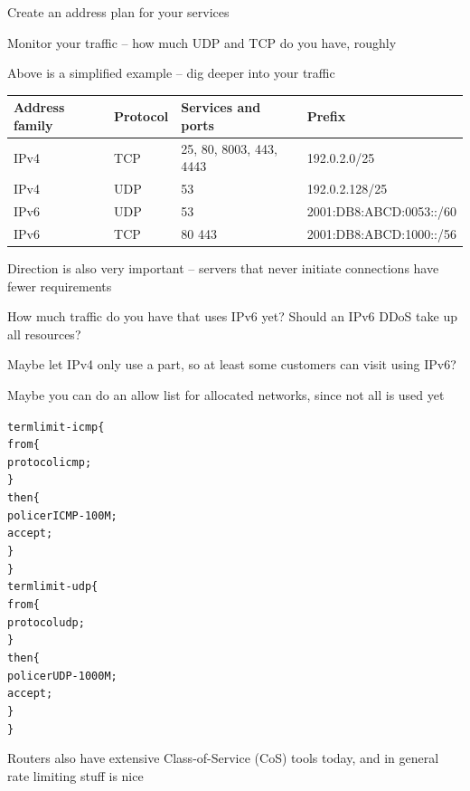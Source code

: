 \documentclass[Screen16to9,17pt]{foils}
\begin{document}
\begin{list2}
\item Create an address plan for your services
\item Monitor your traffic -- how much UDP and TCP do you have, roughly

\item Above is a simplified example -- dig deeper into your traffic
\end{list2}


\begin{tabularx}{\textwidth-5cm}{|p{2cm}|p{2cm}|p{7cm}|X|} \hline
{\bf Address family} & {\bf Protocol} & {\bf Services and ports} & {\bf Prefix}\\\hline
IPv4 & TCP & 25, 80, 8003, 443, 4443 & 192.0.2.0/25 \\\hline
IPv4 & UDP & 53 & 192.0.2.128/25 \\\hline
IPv6 & UDP & 53  & 2001:DB8:ABCD:0053::/60 \\\hline
IPv6 & TCP & 80 443 & 2001:DB8:ABCD:1000::/56 \\\hline
\end{tabularx}

\begin{list2}
\item Direction is also very important -- servers that never initiate connections have fewer requirements
\item How much traffic do you have that uses IPv6 yet? Should an IPv6 DDoS take up all resources?
\item Maybe let IPv4 only use a part, so at least some customers can visit using IPv6?
\item Maybe you can do an allow list for allocated networks, since not all is used yet
\end{list2}


\begin{alltt}\footnotesize
term limit-icmp \{
    from \{
        protocol icmp;
    \}
    then \{
        policer ICMP-100M;
        accept;
    \}
\}
term limit-udp \{
    from \{
        protocol udp;
    \}
    then \{
        policer UDP-1000M;
        accept;
    \}
\}
\end{alltt}

Routers also have extensive Class-of-Service (CoS) tools today, and in general rate limiting stuff is nice
\end{document}
